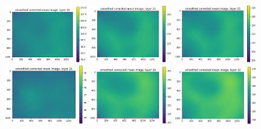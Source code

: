\documentclass[letterpaper,11pt]{article}
\begin{document}
\begin{figure}[!ht]
\includegraphics[width=0.32\textwidth]{images/results/smoothed_corrected_mean_image_layers/smoothed_corrected_mean_image_layer_19_same_scale}
\includegraphics[width=0.32\textwidth]{images/results/smoothed_corrected_mean_image_layers/smoothed_corrected_mean_image_layer_22_same_scale}
\includegraphics[width=0.32\textwidth]{images/results/smoothed_corrected_mean_image_layers/smoothed_corrected_mean_image_layer_25_same_scale}
\includegraphics[width=0.32\textwidth]{images/results/smoothed_corrected_mean_image_layers/smoothed_corrected_mean_image_layer_26_same_scale}
\includegraphics[width=0.32\textwidth]{images/results/smoothed_corrected_mean_image_layers/smoothed_corrected_mean_image_layer_29_same_scale}
\includegraphics[width=0.32\textwidth]{images/results/smoothed_corrected_mean_image_layers/smoothed_corrected_mean_image_layer_32_same_scale}

\end{figure}
\end{document}
